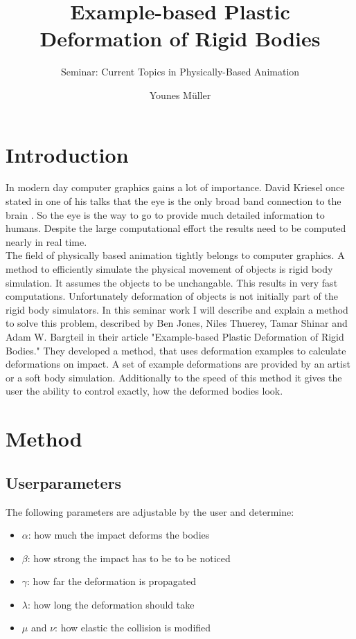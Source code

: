 \documentclass[
	11pt, 
	DIV10,
	a4paper, 
	oneside, 
	headings=normal, 
	captions=tableheading,
	final, 
	numbers=noenddot
]{scrartcl}
\title{Example-based Plastic Deformation of Rigid Bodies}
\subtitle{\vspace{0.5cm}Seminar: Current Topics in Physically-Based Animation}
\author{Younes Müller}
\begin{document}
\maketitle
\tableofcontents
\newpage


\section{Introduction}
In modern day computer graphics gains a lot of importance. David Kriesel once stated in one of his talks that the eye is the only broad band connection to the brain \cite{dkriesel}. So the eye is the way to go to provide much detailed information to humans.
Despite the large computational effort the results need to be computed nearly in real time.\\
The field of physically based animation tightly belongs to computer graphics. A method to efficiently simulate the physical movement of objects is rigid body simulation. It assumes the objects to be unchangable. This results in very fast computations. Unfortunately deformation of objects is not initially part of the rigid body simulators.
In this seminar work I will describe and explain a method to solve this problem, described by Ben Jones, Niles Thuerey, Tamar Shinar and Adam W. Bargteil in their article "Example-based Plastic Deformation of Rigid Bodies."\cite{paper}
They developed a method, that uses deformation examples to calculate deformations on impact.
A set of example deformations are provided by an artist or a soft body simulation. Additionally to the speed of this method it gives the user the ability to control exactly, how the deformed bodies look. 
\section{Method}



\subsection{Userparameters}
The following parameters are adjustable by the user and determine:
\begin{itemize}
	\item $\alpha$: how much the impact deforms the bodies
	\item $\beta$: how strong the impact has to be to be noticed
	\item $\gamma$: how far the deformation is propagated
	\item $\lambda$: how long the deformation should take
	\item $\mu$ and $\nu$: how elastic the collision is modified
\end{itemize}
\end{document}
